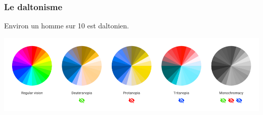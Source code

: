 \documentclass[aspectratio=169]{beamer}
\begin{document}
\begin{frame}[c]\frametitle{Le daltonisme}

Environ un homme sur 10 est daltonien. 

\begin{center}
  \includegraphics[width=1\textwidth]{figures/colorblindness-comparison.png}
\end{center}

\end{frame}







\end{document}
